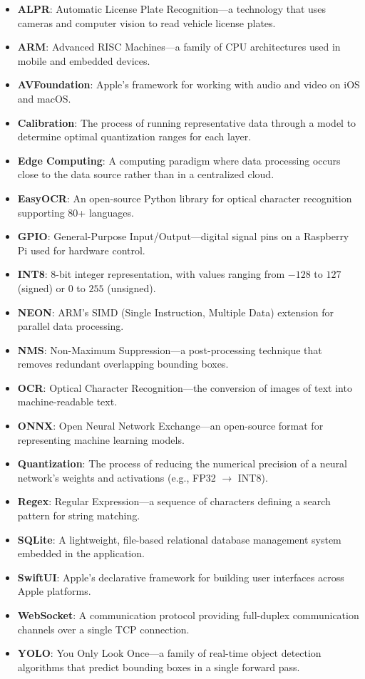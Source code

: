 \documentclass[11pt]{report}
\begin{document}
\begin{itemize}
    \item \textbf{ALPR}: Automatic License Plate Recognition---a technology that uses cameras and computer vision to read vehicle license plates.
    \item \textbf{ARM}: Advanced RISC Machines---a family of CPU architectures used in mobile and embedded devices.
    \item \textbf{AVFoundation}: Apple's framework for working with audio and video on iOS and macOS.
    \item \textbf{Calibration}: The process of running representative data through a model to determine optimal quantization ranges for each layer.
    \item \textbf{Edge Computing}: A computing paradigm where data processing occurs close to the data source rather than in a centralized cloud.
    \item \textbf{EasyOCR}: An open-source Python library for optical character recognition supporting 80+ languages.
    \item \textbf{GPIO}: General-Purpose Input/Output---digital signal pins on a Raspberry Pi used for hardware control.
    \item \textbf{INT8}: 8-bit integer representation, with values ranging from $-128$ to $127$ (signed) or $0$ to $255$ (unsigned).
    \item \textbf{NEON}: ARM's SIMD (Single Instruction, Multiple Data) extension for parallel data processing.
    \item \textbf{NMS}: Non-Maximum Suppression---a post-processing technique that removes redundant overlapping bounding boxes.
    \item \textbf{OCR}: Optical Character Recognition---the conversion of images of text into machine-readable text.
    \item \textbf{ONNX}: Open Neural Network Exchange---an open-source format for representing machine learning models.
    \item \textbf{Quantization}: The process of reducing the numerical precision of a neural network's weights and activations (e.g., FP32 $\to$ INT8).
    \item \textbf{Regex}: Regular Expression---a sequence of characters defining a search pattern for string matching.
    \item \textbf{SQLite}: A lightweight, file-based relational database management system embedded in the application.
    \item \textbf{SwiftUI}: Apple's declarative framework for building user interfaces across Apple platforms.
    \item \textbf{WebSocket}: A communication protocol providing full-duplex communication channels over a single TCP connection.
    \item \textbf{YOLO}: You Only Look Once---a family of real-time object detection algorithms that predict bounding boxes in a single forward pass.
\end{itemize}
\end{document}
